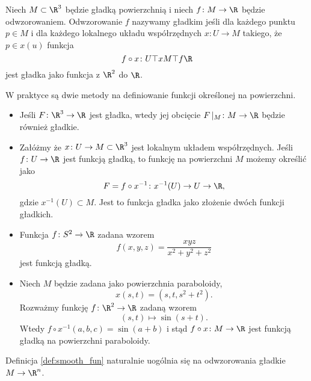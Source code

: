 \begin{frame}

\begin{definicja} \label{def:smooth_fun}
Niech $M\subset \R^3$ będzie gładką powierzchnią i niech $f\colon M\to \R$ będzie odwzorowaniem.
Odwzorowanie $f$ nazywamy gładkim jeśli dla każdego punktu $p\in M$ i dla każdego lokalnego układu współrzędnych $x\colon U\to M$ takiego, że $p\in x(u)$ funkcja \[f\circ x\colon U\top{x}M\top{f}\R\]
jest gładka jako funkcja z $\R^2$ do $\R$.
\end{definicja}

\end{frame}
\begin{frame}

 W praktyce są dwie metody na definiowanie funkcji określonej na powierzchni.
\pause \begin{itemize}[<+->]
\item Jeśli $F\colon \R^3\to \R$ jest gładka, wtedy jej obcięcie $F\,|_M\colon M\to \R$ będzie również gładkie.
\item Załóżmy że  $x\colon U\to M\subset \R^3$ jest lokalnym układem współrzędnych. Jeśli $f\colon U\to \R$ jest funkcją gładką, to funkcję  na powierzchni $M$ możemy określić jako\[F=f\circ x^{-1}\colon x^{-1}(U)\to U\to \R,\] gdzie $x^{-1}(U)\subset M$.
Jest to funkcja gładka jako złożenie dwóch funkcji gładkich.
\end{itemize}

\end{frame}
\begin{frame}[<+->]

\begin{przyklad}
\begin{itemize}
\item Funkcja $f\colon S^2\to \R$ zadana wzorem
\[f(x,y,z)=\frac{xyz}{x^2+y^2+z^2}\]
jest funkcją gładką.
\item Niech $M$ będzie zadana jako powierzchnia paraboloidy, \[x(s,t)=(s,t,s^2+t^2).\]
\pause Rozważmy funkcję $f\colon \R^2\to \R$ zadaną wzorem \[(s,t)\mapsto \sin{(s+t)}.\]
\pause Wtedy $f\circ x^{-1}(a,b,c)=\sin{(a+b)}$  i stąd $f\circ x\colon M\to\R$ jest funkcją gładką na powierzchni paraboloidy.
\end{itemize}
\end{przyklad}

\end{frame}
\begin{uwaga}
Definicja \ref{def:smooth_fun} naturalnie uogólnia się na odwzorowania gładkie $M\to \R^n$.
\end{uwaga}


